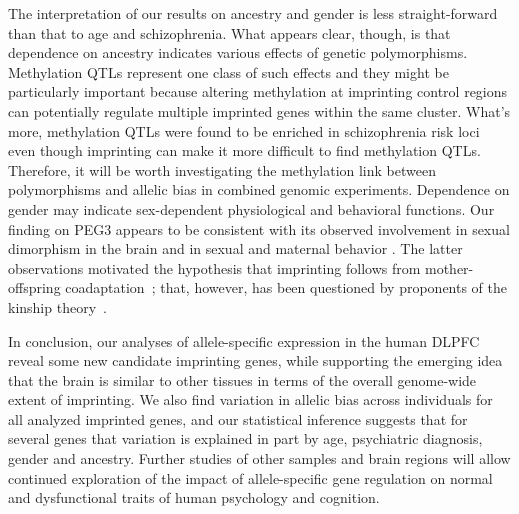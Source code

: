 \documentclass[12pt,letterpaper]{article}
\begin{document}
The interpretation of our results on ancestry and gender is less
straight-forward than that to age and schizophrenia.  What appears clear,
though, is that dependence on ancestry indicates various effects of genetic
polymorphisms.   Methylation QTLs represent one class of such effects and they
might be particularly important because altering methylation at imprinting
control regions can potentially regulate multiple imprinted genes within the
same cluster.  What's more, methylation QTLs were found to be enriched in
schizophrenia risk loci~\cite{Hannon2016} even though imprinting can make it
more difficult to find methylation QTLs.  Therefore, it will be worth
investigating the methylation link between polymorphisms and allelic bias in
combined genomic experiments.  Dependence on gender may indicate sex-dependent
physiological and behavioral functions.  Our finding on PEG3 appears to be
consistent with its observed involvement in sexual dimorphism in the brain and
in sexual and maternal behavior \cite{Broad2009}.  The latter observations
motivated the hypothesis that imprinting follows from mother-offspring
coadaptation~\cite{Keverne2015}; that, however, has been questioned by
proponents of the kinship theory~\cite{Haig2014}.

In conclusion, our analyses of allele-specific expression in the human DLPFC
reveal some new candidate imprinting genes, while supporting the emerging idea
that the brain is similar to other tissues in terms of the overall genome-wide
extent of imprinting.  We also find variation in allelic bias
across individuals for all analyzed imprinted genes, and our statistical
inference suggests that for several genes that variation is explained in part
by age, psychiatric diagnosis, gender and ancestry. Further studies
of other samples and brain regions will allow continued exploration of the
impact of allele-specific gene regulation on normal and dysfunctional traits
of human psychology and cognition.




\newpage

\setcounter{figure}{0}
\makeatletter 
\renewcommand{\thefigure}{S\@arabic\c@figure}
\makeatother

\begin{figure}
\label{fig:clusters}
\end{figure}

\begin{figure}
\label{fig:known-genes}
\end{figure}
\end{document}
